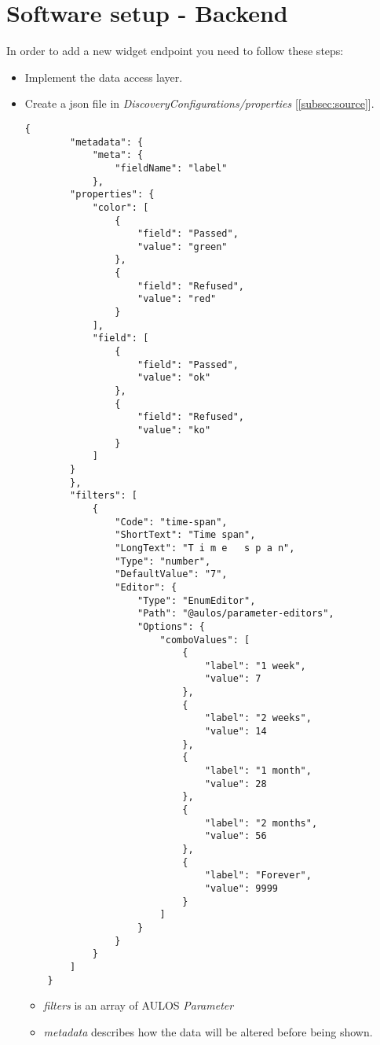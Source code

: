 \section{Software setup - Backend}
In order to add a new widget endpoint you need to follow these steps:
\begin{itemize}
    \item Implement the data access layer.
    \item Create a json file in \textit{DiscoveryConfigurations/properties} [\ref{subsec:source}].
    \begin{lstlisting}[caption={{sourcecode}.json example}, style=javaScriptCode]
    {
        "metadata": {
            "meta": {
                "fieldName": "label"
            },
        "properties": {
            "color": [
                {
                    "field": "Passed",
                    "value": "green"
                },
                {
                    "field": "Refused",
                    "value": "red"
                }
            ],
            "field": [
                {
                    "field": "Passed",
                    "value": "ok"
                },
                {
                    "field": "Refused",
                    "value": "ko"
                }
            ]
        }
        },
        "filters": [
            {
                "Code": "time-span",
                "ShortText": "Time span",
                "LongText": "T i m e   s p a n",
                "Type": "number",
                "DefaultValue": "7",
                "Editor": {
                    "Type": "EnumEditor",
                    "Path": "@aulos/parameter-editors",
                    "Options": {
                        "comboValues": [
                            {
                                "label": "1 week",
                                "value": 7
                            },
                            {
                                "label": "2 weeks",
                                "value": 14
                            },
                            {
                                "label": "1 month",
                                "value": 28
                            },
                            {
                                "label": "2 months",
                                "value": 56
                            },
                            {
                                "label": "Forever",
                                "value": 9999
                            }
                        ]
                    }
                }
            }   
        ]
    }
    \end{lstlisting}
    \begin{itemize}
    \item \textit{filters} is an array of AULOS \textit{Parameter}  
    \item \textit{metadata} describes how the data will be altered before being shown.
    

\end{itemize}
\end{itemize}
